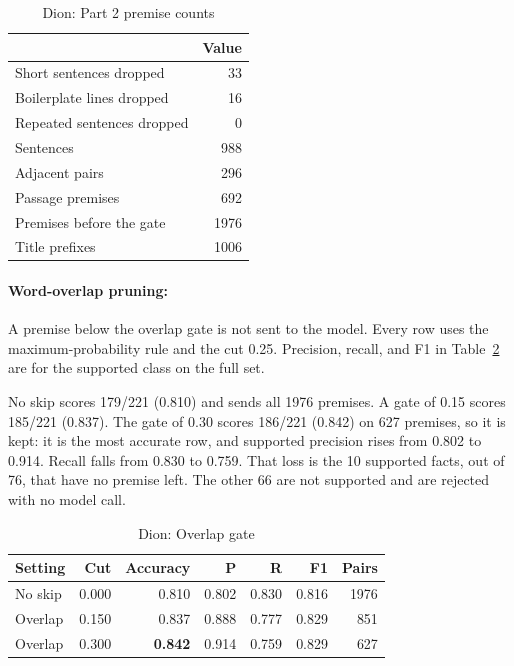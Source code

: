 \documentclass[12pt,a4paper]{article}
\begin{document}
\begin{table}[H]
\centering
\small
\begin{tabular}{@{}lr@{}}
\toprule
 & Value \\
\midrule
Short sentences dropped & 33 \\
Boilerplate lines dropped & 16 \\
Repeated sentences dropped & 0 \\
Sentences & 988 \\
Adjacent pairs & 296 \\
Passage premises & 692 \\
Premises before the gate & 1976 \\
Title prefixes & 1006 \\
\bottomrule
\end{tabular}
\caption{Dion: Part 2 premise counts}
\label{tab:premcounts}
\end{table}

\paragraph{Word-overlap pruning:}

A premise below the overlap gate is not sent to the model. Every row uses the maximum-probability rule and the cut 0.25. Precision, recall, and F1 in Table~\ref{tab:prune} are for the supported class on the full set.

No skip scores 179/221 (0.810) and sends all 1976 premises. A gate of 0.15 scores 185/221 (0.837). The gate of 0.30 scores 186/221 (0.842) on 627 premises, so it is kept: it is the most accurate row, and supported precision rises from 0.802 to 0.914. Recall falls from 0.830 to 0.759. That loss is the 10 supported facts, out of 76, that have no premise left. The other 66 are not supported and are rejected with no model call.

\begin{table}[H]
\centering
\small
\begin{tabular}{@{}lrrrrrr@{}}
\toprule
Setting & Cut & Accuracy & P & R & F1 & Pairs \\
\midrule
No skip & 0.000 & 0.810 & 0.802 & 0.830 & 0.816 & 1976 \\
Overlap & 0.150 & 0.837 & 0.888 & 0.777 & 0.829 & 851 \\
Overlap & 0.300 & \textbf{0.842} & 0.914 & 0.759 & 0.829 & 627 \\
\bottomrule
\end{tabular}
\caption{Dion: Overlap gate}
\label{tab:prune}
\end{table}
\end{document}
